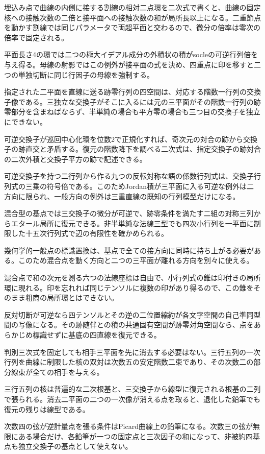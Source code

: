 \documentclass[11pt,a4paper]{ltjsarticle}
\begin{document}
埋込み点で曲線の内側に接する割線の相対二点環を二次式で書くと、曲線の固定核への接触次数の二倍と接平面への接触次数の和が局所長以上になる。二重節点を動かす割線では同じパラメータで両超平面と交わるので、微分の倍率は零次の倍率で固定される。

平面長さ4の環では二つの極大イデアル成分の外積状の積がsocleの可逆行列倍を与え得る。母線の射影ではこの例外が接平面の式を決め、四重点に印を移すと二つの単独切断に同じ行因子の母線を強制する。

指定された二平面を直線に送る跡零行列の四空間は、対応する階数一行列の交換子像である。三独立な交換子がそこに入るには元の三平面がその階数一行列の跡零部分を含まねばならず、半単純の場合も平方零の場合も三つ目の交換子を独立にできない。

可逆交換子が巡回中心化環を位数2で正規化すれば、奇次元の対合の跡から交換子の跡直交と矛盾する。復元の階数降下を調べる二次式は、指定交換子の跡対合の二次外積と交換子平方の跡で記述できる。

可逆交換子を持つ二行列から作る九つの反転対称な語の係数行列式は、交換子行列式の三乗の符号倍である。このためJordan積が三平面に入る可逆な例外は二方向に限られ、一般方向の例外は三重直線の既知の行列模型だけになる。

混合型の基点では三交換子の微分が可逆で、跡零条件を満たす二組の対称三列からエタール局所に復元できる。非半単純な法線三型でも四次小行列を一平面に制限した十五次行列式で辺の有限性を確かめられる。

幾何学的一般点の標識置換は、基点で全ての接方向に同時に持ち上がる必要がある。このため混合点を動く方向と二つの三平面が離れる方向を別々に使える。

混合点で和の次元を測る六つの法線座標は自由で、小行列式の錐は印付きの局所環に現れる。印を忘れれば同じテンソルに複数の印があり得るので、この錐をそのまま粗商の局所環とはできない。

反対切断が可逆なら四テンソルとその逆の二位置縮約が各文字空間の自己準同型間の写像になる。その跡随伴との積の共通固有空間が跡零対角空間なら、点をあらかじめ標識せずに基底の四直線を復元できる。

判別三次式を固定しても相手三平面を先に消去する必要はない。三行五列の一次行列を曲線に制限した核の双対は次数五の安定階数二束であり、その次数二の部分線束が全ての相手を与える。

三行五列の核は普遍的な二次根基と、三交換子から線型に復元される根基の二列で張られる。消去二平面の二つの一次像が消える点を取ると、退化した鉛筆でも復元の残りは線型である。

次数四の弦が逆計量点を張る条件はPicard曲線上の鉛筆になる。次数三の弦が無限にある場合だけ、各鉛筆が一つの固定点と三次因子の和になって、非被約四基点も独立交換子の基点として使えない。
\end{document}

